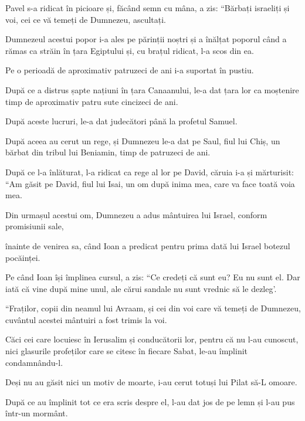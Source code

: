 {\par }{\PP {}Pavel s-a ridicat în picioare și, făcând semn cu mâna, a zis: “Bărbați israeliți și voi, cei ce vă temeți de Dumnezeu, ascultați.

Dumnezeul acestui popor i-a
ales pe părinții noștri și a înălțat poporul când a rămas ca străin în țara Egiptului și, cu brațul ridicat, l-a scos din ea.

Pe o perioadă de aproximativ patruzeci de ani i-a suportat în pustiu.

După ce a distrus șapte națiuni în țara Canaanului, le-a dat țara lor ca moștenire timp de aproximativ patru sute cincizeci de ani.

După aceste lucruri, le-a dat judecători până la profetul Samuel.

După aceea au cerut un rege, și Dumnezeu le-a dat pe Saul, fiul lui Chiș, un bărbat din tribul lui Beniamin, timp de patruzeci de ani.

După ce l-a înlăturat, l-a ridicat ca rege al lor pe David, căruia i-a și mărturisit: “Am găsit pe David, fiul lui Isai, un om după inima mea, care va face toată voia mea.

Din urmașul acestui om, Dumnezeu a adus mântuirea lui Israel, conform promisiunii sale,

înainte de venirea sa, când Ioan a predicat pentru prima dată lui Israel botezul pocăinței.

Pe când Ioan își împlinea cursul, a zis: “Ce credeți că sunt eu? Eu nu sunt el. Dar iată că vine după mine unul, ale cărui sandale nu sunt vrednic să le dezleg'.


\par }{\PP {}“Fraților, copii din neamul lui Avraam, și cei din voi care vă temeți de Dumnezeu, cuvântul acestei mântuiri a fost trimis la voi.

Căci cei care locuiesc în Ierusalim și conducătorii lor, pentru că nu l-au cunoscut, nici glasurile profeților care se citesc în fiecare Sabat, le-au împlinit condamnându-l.

Deși nu au găsit nici un motiv de moarte, i-au cerut totuși lui Pilat să-L omoare.

După ce au împlinit tot ce era scris despre el, l-au dat jos de pe lemn și l-au pus într-un mormânt.

}
